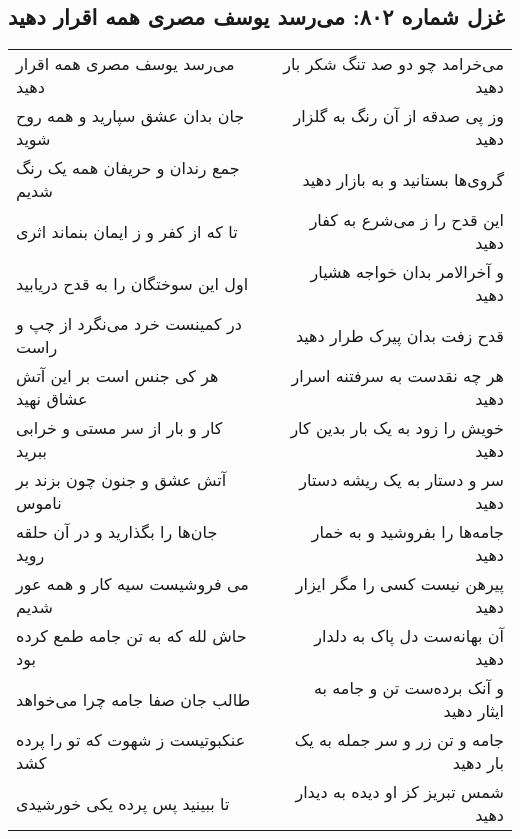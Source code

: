 \begin{center}
\section*{غزل شماره ۸۰۲: می‌رسد یوسف مصری همه اقرار دهید}
\label{sec:0802}
\begin{longtable}{l p{0.5cm} r}
می‌رسد یوسف مصری همه اقرار دهید
&&
می‌خرامد چو دو صد تنگ شکر بار دهید
\\
جان بدان عشق سپارید و همه روح شوید
&&
وز پی صدقه از آن رنگ به گلزار دهید
\\
جمع رندان و حریفان همه یک رنگ شدیم
&&
گروی‌ها بستانید و به بازار دهید
\\
تا که از کفر و ز ایمان بنماند اثری
&&
این قدح را ز می‌شرع به کفار دهید
\\
اول این سوختگان را به قدح دریابید
&&
و آخرالامر بدان خواجه هشیار دهید
\\
در کمینست خرد می‌نگرد از چپ و راست
&&
قدح زفت بدان پیرک طرار دهید
\\
هر کی جنس است بر این آتش عشاق نهید
&&
هر چه نقدست به سرفتنه اسرار دهید
\\
کار و بار از سر مستی و خرابی ببرید
&&
خویش را زود به یک بار بدین کار دهید
\\
آتش عشق و جنون چون بزند بر ناموس
&&
سر و دستار به یک ریشه دستار دهید
\\
جان‌ها را بگذارید و در آن حلقه روید
&&
جامه‌ها را بفروشید و به خمار دهید
\\
می فروشیست سیه کار و همه عور شدیم
&&
پیرهن نیست کسی را مگر ایزار دهید
\\
حاش لله که به تن جامه طمع کرده بود
&&
آن بهانه‌ست دل پاک به دلدار دهید
\\
طالب جان صفا جامه چرا می‌خواهد
&&
و آنک برده‌ست تن و جامه به ایثار دهید
\\
عنکبوتیست ز شهوت که تو را پرده کشد
&&
جامه و تن زر و سر جمله به یک بار دهید
\\
تا ببینید پس پرده یکی خورشیدی
&&
شمس تبریز کز او دیده به دیدار دهید
\\
\end{longtable}
\end{center}

